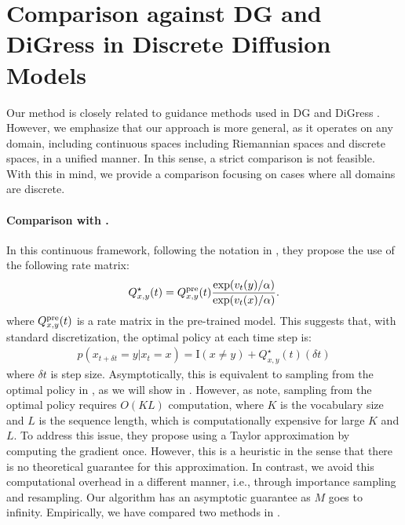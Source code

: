{
\section{Comparison against DG \citep{nisonoff2024unlocking} and DiGress \citep{vignac2022digress} in Discrete Diffusion Models}
\label{sec:DG}

Our method is closely related to guidance methods used in DG \citep{nisonoff2024unlocking} and DiGress \citep{vignac2022digress}. However, we emphasize that our approach is more general, as it operates on any domain, including continuous spaces including Riemannian spaces and discrete spaces, in a unified manner. In this sense,  a strict comparison is not feasible. With this in mind, we provide a comparison focusing on cases where all domains are discrete.

\paragraph{Comparison with \citet{nisonoff2024unlocking}.}

In this continuous framework, following the notation in \citep{lou2023discrete}, they propose the use of the following rate matrix: 
\begin{align*} 
Q^{\star}_{x,y}(t) = Q^{\mathrm{pre}}_{x,y}(t)\frac{\exp(v_{t}(y)/\alpha)}{\exp(v_{t}(x)/\alpha)}. 
\end{align*} 
where $Q^{\mathrm{pre}}_{x,y}(t)$ is a rate matrix in the pre-trained model. This suggests that, with standard discretization, the optimal policy at each time step is: 
\begin{align}\label{eq:formula} 
 p(x_{t+\delta t}=y|x_t=x) = \mathrm{I}(x\neq y) + Q^{\star}_{x,y}(t)(\delta t)
\end{align}
where $\delta t$ is step size. Asymptotically, this is equivalent to sampling from the optimal policy in , as we will show in . However, as \citet{nisonoff2024unlocking} note, sampling from the optimal policy requires $O(KL)$ computation, where $K$ is the vocabulary size and $L$ is the sequence length, which is computationally expensive for large $K$ and $L$. To address this issue, they propose using a Taylor approximation by computing the gradient once. However, this is a heuristic in the sense that there is no theoretical guarantee for this approximation. In contrast, we avoid this computational overhead in a different manner, i.e., through importance sampling and resampling. Our algorithm has an asymptotic guarantee as $M$ goes to infinity. Empirically, we have compared two methods in . 

}
